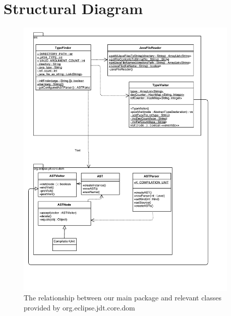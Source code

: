 \documentclass[12p]{article}
\begin{document}
\section{Structural Diagram}
\begin{figure}[H]
  \includegraphics[width=0.95\textwidth]{SengUml.pdf}
  \caption{The relationship between our main package and relevant classes provided by org.eclipse.jdt.core.dom} %
  \label{fig:structural}
\end{figure}
\end{document}

